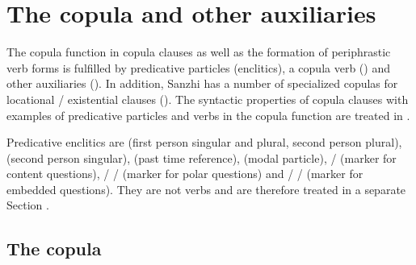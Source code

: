 \chapter{The copula and other auxiliaries}
\label{cpt:copulaotherauxiliaries}

The copula function in copula clauses as well as the formation of periphrastic verb forms is fulfilled by predicative particles (enclitics), a copula verb () and other auxiliaries (). In addition, Sanzhi has a number of specialized copulas for locational / existential clauses (). The syntactic properties of copula clauses with examples of predicative particles and verbs in the copula function are treated in .

Predicative enclitics are  (first person singular and plural, second person plural),  (second person singular),  (past time reference),  (modal particle),  /  (marker for content questions),  /  /  (marker for polar questions) and   /  /  (marker for embedded questions). They are not verbs and are therefore treated in a separate Section .



\section{The copula}
\label{sec:The copula}

